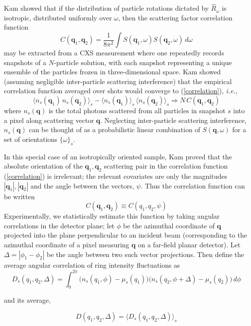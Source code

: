 \documentclass [11pt,fleqn]{article}
\def \be {\begin{equation}}
\def \ee {\end{equation}}
\begin{document}
Kam showed that if the distribution of particle rotations dictated by $\hat{R}_\omega$ is isotropic, distributed uniformly over $\omega$, then the scattering factor correlation function
\be \label{correlation}
C(\bm q_1, \bm q_2) = \frac{1}{8 \pi^{2}}\int S( \bm q_{1},\omega ) S( \bm q_{2},\omega ) \, d \omega
\ee
may be extracted from a CXS measurement where one repeatedly records snapshots of a $N$-particle solution, with each snapshot representing a unique ensemble of the particles frozen in three-dimensional space. Kam showed (assuming negligible inter-particle scattering interference) that the empirical correlation function averaged over shots would converge to (\ref{correlation}), \textit{i.e.},
\be \label{converge}
\big \langle   n_s(\bm q_1)  \, n_s(\bm q_2) \big \rangle_s  - \big \langle {n}_s(\bm q_1) \big \rangle_s \, \big \langle {n}_s(\bm q_2) \big \rangle_s  \Rightarrow N \, C(\bm q_1, \bm q_2) 
\ee
where $n_{s}(\bm q)$ is the total photons scattered from all particles in snapshot $s$ into a pixel along scattering vector $\bm q$. Neglecting inter-particle scattering interference, $n_{s}(\bm q)$ can be thought of as a probabilistic linear combination of $S(\bm q,\omega)$ for a set of orientations $\{ \omega\}_{s}$.

In this special case of an isotropically oriented sample, Kam proved that the absolute orientation of the $\bm q_1, \bm q_2$ scattering pair in the correlation function (\ref{correlation}) is irrelevant; the relevant covariates are only the magnitudes $| \bm q_1 | , | \bm q_2 | $ and the angle between the vectors, $\psi$. Thus the correlation function can be written 
\[
C(\bm q_1, \bm q_2)  \equiv C (q_1,q_2, \psi  )
\]
Experimentally, we statistically estimate this function by taking angular correlations in the detector plane; let $\phi$ be the azimuthal coordinate of $\bm q$ projected into the plane perpendicular to an incident beam (corresponding to the azimuthal coordinate of a pixel measuring $\bm q$ on a far-field planar detector). Let $\Delta = |\phi_{1} - \phi_{2}|$ be the angle between two such vector projections. Then define the average angular correlation of ring intensity fluctuations as
\be \label{angular_shot}
D_s(q_1,q_2, \Delta  ) = \int_{0}^{2\pi}  \Big ( n_s(q_1,\phi) -   \mu_s( q_1) \Big) \Big ( n_s(q_2,\phi + \Delta) -   \mu_s( q_2) \Big)  \, d\phi  
\ee

and its average,

\be \label{angular}
D(q_1,q_2, \Delta  ) = \big \langle D_s(q_1,q_2, \Delta  ) \big \rangle_{s}
\ee
\end{document}
